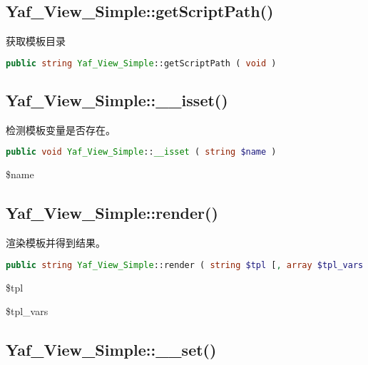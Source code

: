 \begin{lstlisting}[language=PHP]

\end{lstlisting}

\subsection{Yaf\_View\_Simple::getScriptPath()}

获取模板目录


\begin{lstlisting}[language=PHP]
public string Yaf_View_Simple::getScriptPath ( void )
\end{lstlisting}





\subsection{Yaf\_View\_Simple::\_\_isset()}

检测模板变量是否存在。

\begin{lstlisting}[language=PHP]
public void Yaf_View_Simple::__isset ( string $name )
\end{lstlisting}

\begin{compactitem}
\item \$name
\end{compactitem}

\subsection{Yaf\_View\_Simple::render()}

渲染模板并得到结果。

\begin{lstlisting}[language=PHP]
public string Yaf_View_Simple::render ( string $tpl [, array $tpl_vars ] )
\end{lstlisting}

\begin{compactitem}
\item \$tpl
\item \$tpl\_vars
\end{compactitem}



\subsection{Yaf\_View\_Simple::\_\_set()}

